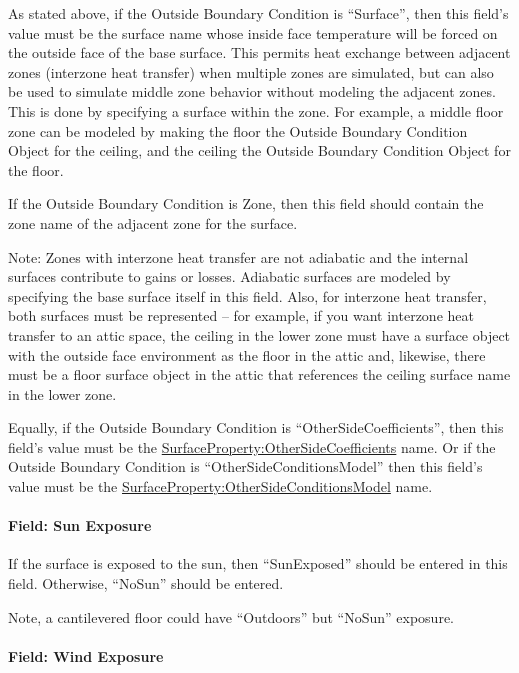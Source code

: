 As stated above, if the Outside Boundary Condition is ``Surface'', then this field's value must be the surface name whose inside face temperature will be forced on the outside face of the base surface. This permits heat exchange between adjacent zones (interzone heat transfer) when multiple zones are simulated, but can also be used to simulate middle zone behavior without modeling the adjacent zones. This is done by specifying a surface within the zone. For example, a middle floor zone can be modeled by making the floor the Outside Boundary Condition Object for the ceiling, and the ceiling the Outside Boundary Condition Object for the floor.

If the Outside Boundary Condition is Zone, then this field should contain the zone name of the adjacent zone for the surface.

\begin{callout}
Note: Zones with interzone heat transfer are not adiabatic and the internal surfaces contribute to gains or losses. Adiabatic surfaces are modeled by specifying the base surface itself in this field. Also, for interzone heat transfer, both surfaces must be represented -- for example, if you want interzone heat transfer to an attic space, the ceiling in the lower zone must have a surface object with the outside face environment as the floor in the attic and, likewise, there must be a floor surface object in the attic that references the ceiling surface name in the lower zone.
\end{callout}

Equally, if the Outside Boundary Condition is ``OtherSideCoefficients'', then this field's value must be the \hyperref[surfacepropertyothersidecoefficients]{SurfaceProperty:OtherSideCoefficients} name. Or if the Outside Boundary Condition is ``OtherSideConditionsModel'' then this field's value must be the \hyperref[surfacepropertyothersideconditionsmodel]{SurfaceProperty:OtherSideConditionsModel} name.

\paragraph{Field: Sun Exposure}\label{field-sun-exposure-1}

If the surface is exposed to the sun, then ``SunExposed'' should be entered in this field. Otherwise, ``NoSun'' should be entered.

Note, a cantilevered floor could have ``Outdoors'' but ``NoSun'' exposure.

\paragraph{Field: Wind Exposure}\label{field-wind-exposure-1}

